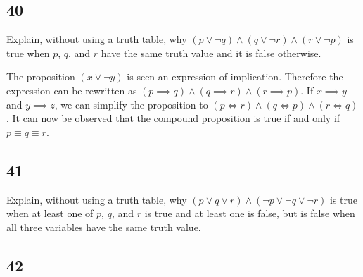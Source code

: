 \documentclass{article}
\begin{document}
\subsection{40}

Explain, without using a truth table, why $ \left( p \lor \neg q \right) \land \left( q \lor \neg r \right) \land \left( r \lor \neg p \right) $ is true when $ p $, $ q $, and $ r $ have the same truth value and it is false otherwise.

The proposition $ \left( x \lor \neg y \right) $ is seen an expression of implication. Therefore the expression can be rewritten as $ \left( p \implies q \right) \land \left( q \implies r \right) \land \left( r \implies p \right) $. If $ x \implies y $ and $ y \implies z $, we can simplify the proposition to $ \left( p \iff r \right) \land \left( q \iff p \right) \land \left( r \iff q \right) $. It can now be observed that the compound proposition is true if and only if $ p \equiv q \equiv r $.

\subsection{41}

Explain, without using a truth table, why $ \left( p \lor q \lor r \right) \land \left( \neg p \lor \neg q \lor \neg r \right) $ is true when at least one of $ p $, $ q $, and $ r $ is true and at least one is false, but is false when all three variables have the same truth value.

\subsection{42}
\end{document}
